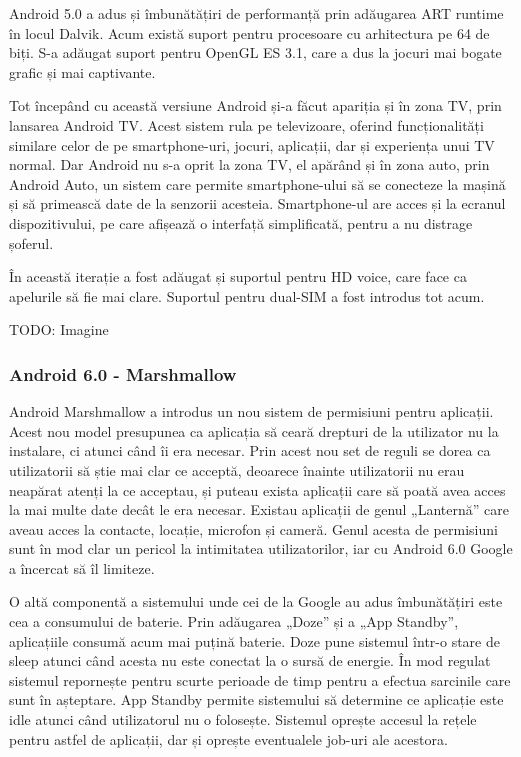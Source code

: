 \documentclass[12pt,a4paper]{article}
\begin{document}
	Android 5.0 a adus și îmbunătățiri de performanță prin adăugarea ART runtime în locul Dalvik. Acum există suport pentru procesoare cu arhitectura pe 64 de biți. S-a adăugat suport pentru OpenGL ES 3.1, care a dus la jocuri mai bogate grafic și mai captivante.
	
	Tot începând cu această versiune Android și-a făcut apariția și în zona TV, prin lansarea Android TV. Acest sistem rula pe televizoare, oferind funcționalități similare celor de pe smartphone-uri, jocuri, aplicații, dar și experiența unui TV normal. Dar Android nu s-a oprit la zona TV, el apărând și în zona auto, prin Android Auto, un sistem care permite smartphone-ului să se conecteze la mașină și să primească date de la senzorii acesteia. Smartphone-ul are acces și la ecranul dispozitivului, pe care afișează o interfață simplificată, pentru a nu distrage șoferul.

	În această iterație a fost adăugat și suportul pentru HD voice, care face ca apelurile să fie mai clare. Suportul pentru dual-SIM a fost introdus tot acum.

	TODO: Imagine
	
\subsubsection{Android 6.0 - Marshmallow}
Android Marshmallow a introdus un nou sistem de permisiuni pentru aplicații. Acest nou model presupunea ca aplicația să ceară drepturi de la utilizator nu la instalare, ci atunci când îi era necesar. Prin acest nou set de reguli se dorea ca utilizatorii să știe mai clar ce acceptă, deoarece înainte utilizatorii nu erau neapărat atenți la ce acceptau, și puteau exista aplicații care să poată avea acces la mai multe date decât le era necesar. Existau aplicații de genul „Lanternă” care aveau acces la contacte, locație, microfon și cameră. Genul acesta de permisiuni sunt în mod clar un pericol la intimitatea utilizatorilor, iar cu Android 6.0 Google a încercat să îl limiteze.

	O altă componentă a sistemului unde cei de la Google au adus îmbunătățiri este cea a consumului de baterie. Prin adăugarea „Doze” și a „App Standby”, aplicațiile consumă acum mai puțină baterie. Doze pune sistemul într-o stare de sleep atunci când acesta nu este conectat la o sursă de energie. În mod regulat sistemul repornește pentru scurte perioade de timp pentru a efectua sarcinile care sunt în așteptare. App Standby permite sistemului să determine ce aplicație este idle atunci când utilizatorul nu o folosește. Sistemul oprește accesul la rețele pentru astfel de aplicații, dar și oprește eventualele job-uri ale acestora.
\end{document}
